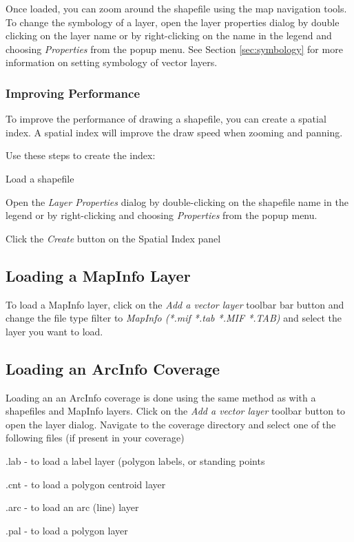 Once loaded, you can zoom around the shapefile using the map navigation tools.
To change the symbology of a layer, open the layer properties dialog by double
clicking on the layer name or by right-clicking on the name in the legend and
choosing \textsl{Properties} from the popup menu. See Section
\ref{sec:symbology} for more information on setting symbology of vector
layers.  
\subsubsection{Improving Performance}
To improve the performance of drawing a shapefile, you can create a spatial
index. A  spatial index will improve the draw speed when
zooming and panning.  

Use these steps to create the index:
\begin{compactenum}
\item Load a shapefile
\item Open the \textit{Layer Properties} dialog by double-clicking on the shapefile
name in the legend or by right-clicking and choosing \textit{Properties} from
the popup menu.
\item Click the \textit{Create} button on the Spatial Index panel
\end{compactenum}

\subsection{Loading a MapInfo Layer}
To load a MapInfo layer, click on the \textit{Add a vector layer}
toolbar bar button and change the file type filter to \textit{MapInfo (*.mif
*.tab *.MIF *.TAB)} and select the layer you want to load.

\subsection{Loading an ArcInfo Coverage}
Loading an an ArcInfo coverage is done using the same method as with a
shapefiles and MapInfo layers. Click on the \textit{Add a vector layer} toolbar
button to open the layer dialog.  Navigate to the coverage directory and select
one of the following files (if present in your coverage)
\begin{compactenum}
\item .lab - to load a label layer (polygon labels, or standing points
\item .cnt - to load a polygon centroid layer 
\item .arc - to load an arc (line) layer
\item .pal - to load a polygon layer
\end{compactenum}

